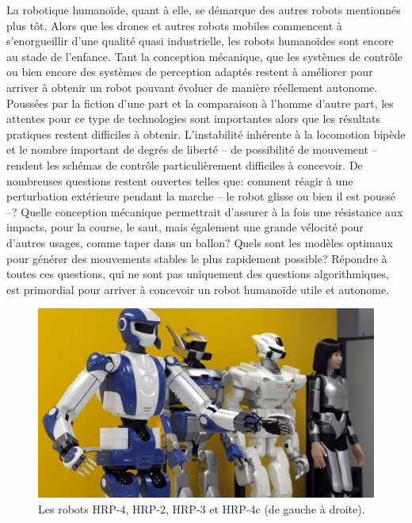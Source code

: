 La robotique humanoïde, quant à elle, se démarque des autres robots
mentionnés plus tôt. Alors que les drones et autres robots mobiles
commencent à s'enorgueillir d'une qualité quasi industrielle, les
robots humanoïdes sont encore au stade de l'enfance. Tant la
conception mécanique, que les systèmes de contrôle ou bien encore des
systèmes de perception adaptés restent à améliorer pour arriver à
obtenir un robot pouvant évoluer de manière réellement
autonome. Poussées par la fiction d'une part et la comparaison à
l'homme d'autre part, les attentes pour ce type de technologies sont
importantes alors que les résultats pratiques restent difficiles à
obtenir. L'instabilité inhérente à la locomotion bipède et le nombre
important de degrés de liberté -- de possibilité de mouvement --
rendent les schémas de contrôle particulièrement difficiles à
concevoir. De nombreuses questions restent ouvertes telles que:
comment réagir à une perturbation extérieure pendant la marche -- le
robot glisse ou bien il est poussé --? Quelle conception mécanique
permettrait d'assurer à la fois une résistance aux impacts, pour la
course, le saut, mais également une grande vélocité pour d'autres
usages, comme taper dans un ballon? Quels sont les modèles optimaux
pour générer des mouvements stables le plus rapidement possible?
Répondre à toutes ces questions, qui ne sont pas uniquement des
questions algorithmiques, est primordial pour arriver à concevoir un
robot humanoïde utile et autonome.

\begin{figure}
  \begin{center}
    \includegraphics[width=\linewidth]{src/chap0-introduction/hrp_family.jpg}
  \end{center}
  \caption{Les robots HRP-4, HRP-2, HRP-3 et HRP-4c (de gauche à
    droite). \label{fig:hrpfamily}}
\end{figure}

